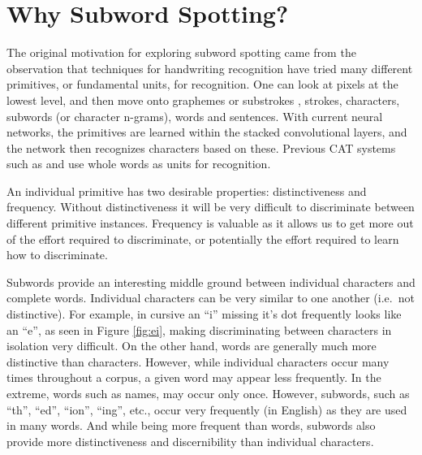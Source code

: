 \documentclass[ms,electronic,twosidetoc,letterpaper,chaptercenter,parttop,lof,lot]{byumsphd}
\begin{document}

\section{Why Subword Spotting?}

The original motivation for exploring subword spotting came from the observation that techniques for handwriting recognition have tried many different primitives, or fundamental units, for recognition. One can look at pixels at the lowest level, and then move onto graphemes or substrokes \cite{liang2012}, strokes, characters, subwords (or character n-grams), words and sentences. With current neural networks, the primitives are learned within the stacked convolutional layers, and the network then recognizes characters based on these. Previous CAT systems such as \cite{Clawson2014} and \cite{Zagoris2015} use whole words as units for recognition. 



An individual primitive has two desirable properties: distinctiveness and frequency. Without distinctiveness it will be very difficult to discriminate between different primitive instances. Frequency is valuable as it allows us to get more out of the effort required to discriminate, or potentially the effort required to learn how to discriminate.

Subwords provide an interesting middle ground between individual characters and complete words. %
Individual characters can be very similar to one another (i.e.~not distinctive). For example, in cursive an ``i'' missing it's dot frequently looks like an ``e'', as seen in Figure \ref{fig:ei}, making discriminating between characters in isolation very difficult. On the other hand, words are generally much more distinctive than characters. However, while individual characters occur many times throughout a corpus, a given word may appear less frequently. In the extreme, words such as names, may occur only once. However, subwords, such as ``th'', ``ed'', ``ion'', ``ing'', etc., occur very frequently (in English) as they are used in many words. And while being more frequent than words, subwords also provide more distinctiveness and discernibility than individual characters.
\end{document}
